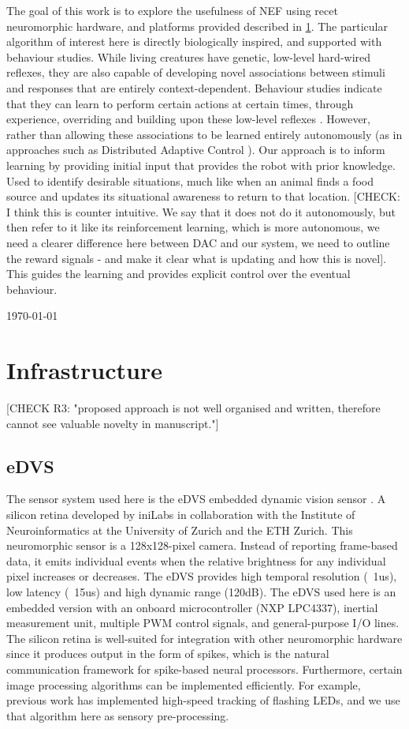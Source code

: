 \documentclass[conference]{IEEEtran}
\begin{document}
The goal of this work is to explore the usefulness of NEF using recet neuromorphic hardware, and platforms provided described in \ref{infrastructure}. The particular algorithm of interest here is directly biologically inspired, and supported with behaviour studies. While living creatures have genetic, low-level hard-wired reflexes, they are also capable of developing novel associations between stimuli and responses that are entirely context-dependent. Behaviour studies indicate that they can learn to perform certain actions at certain times, through experience, overriding and building upon these low-level reflexes \cite{kim2007encoding}. However, rather than allowing these associations to be learned entirely autonomously (as in approaches such as Distributed Adaptive Control \cite{verschure2012distributed}). Our approach is to inform learning by providing initial input that provides the robot with prior knowledge.  Used to identify desirable situations, much like when an animal finds a food source and updates its situational awareness to return to that location. [CHECK: I think this is counter intuitive. We say that it does not do it autonomously, but then refer to it like its reinforcement learning, which is more autonomous, we need a clearer difference here between DAC and our system, we need to outline the reward signals - and make it clear what is updating and how this is novel]. This guides the learning and provides explicit control over the eventual behaviour. 

\hfill \today

\section{Infrastructure}
\label{infrastructure}

[CHECK R3: "proposed approach is not well organised and written, therefore cannot see valuable novelty in manuscript."]

\subsection{eDVS}
The sensor system used here is the eDVS embedded dynamic vision sensor \cite{conradt2009embedded}.  A silicon retina developed by iniLabs in collaboration with the Institute of Neuroinformatics at the University of Zurich and the ETH Zurich. This neuromorphic sensor is a 128x128-pixel camera. Instead of reporting frame-based data, it emits individual events when the relative brightness for any individual pixel increases or decreases. The eDVS provides high temporal resolution (~1us), low latency (~15us) and high dynamic range (120dB). The eDVS used here is an embedded version with an onboard microcontroller (NXP LPC4337), inertial measurement unit, multiple PWM control signals, and general-purpose I/O lines. The silicon retina is well-suited for integration with other neuromorphic hardware since it produces output in the form of spikes, which is the natural communication framework for spike-based neural processors. Furthermore, certain image processing algorithms can be implemented efficiently. For example, previous work \cite{muller2011miniature} has implemented high-speed tracking of flashing LEDs, and we use that algorithm here as sensory pre-processing.
\end{document}
